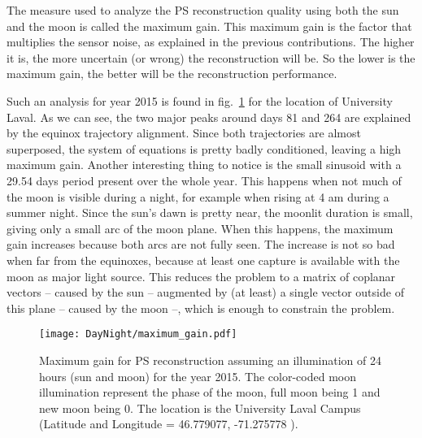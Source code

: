 The measure used to analyze the PS reconstruction quality using both the sun and the moon is called the maximum gain. This maximum gain is the factor that multiplies the sensor noise, as explained in the previous contributions. The higher it is, the more uncertain (or wrong) the reconstruction will be. So the lower is the maximum gain, the better will be the reconstruction performance.

Such an analysis for year 2015 is found in fig.~\ref{fig:DN-maximum_gain} for the location of University Laval. As we can see, the two major peaks around days 81 and 264 are explained by the equinox trajectory alignment. Since both trajectories are almost superposed, the system of equations is pretty badly conditioned, leaving a high maximum gain. Another interesting thing to notice is the small sinusoid with a 29.54 days period present over the whole year. This happens when not much of the moon is visible during a night, for example when rising at 4 am during a summer night. Since the sun's dawn is pretty near, the moonlit duration is small, giving only a small arc of the moon plane. When this happens, the maximum gain increases because both arcs are not fully seen. The increase is not so bad when far from the equinoxes, because at least one capture is available with the moon as major light source. This reduces the problem to a matrix of coplanar vectors -- caused by the sun -- augmented by (at least) a single vector outside of this plane -- caused by the moon --, which is enough to constrain the problem.

\begin{figure}
\centering
\texttt{[image: DayNight/maximum\_gain.pdf]}
\caption{Maximum gain for PS reconstruction assuming an illumination of 24 hours (sun and moon) for the year 2015. The color-coded moon illumination represent the phase of the moon, full moon being 1 and new moon being 0. The location is the University Laval Campus (Latitude and Longitude = 46.779077, -71.275778 ). }
\label{fig:DN-maximum_gain}
\end{figure}


